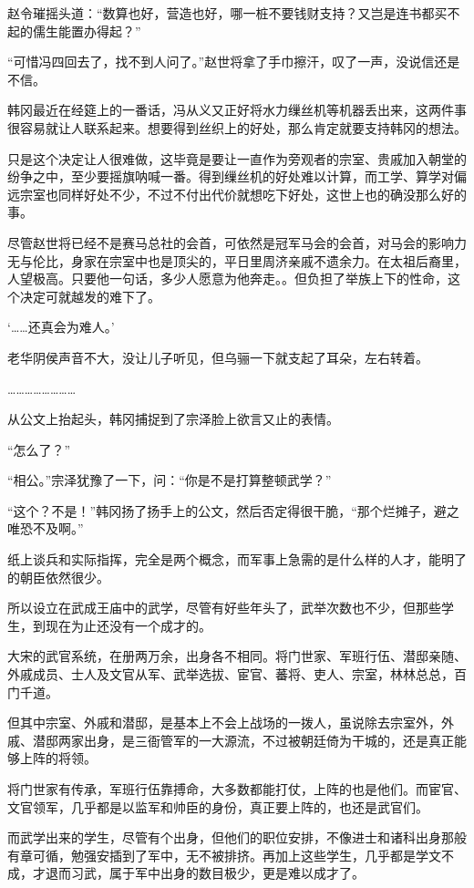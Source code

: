 赵令璀摇头道：“数算也好，营造也好，哪一桩不要钱财支持？又岂是连书都买不起的儒生能置办得起？”

“可惜冯四回去了，找不到人问了。”赵世将拿了手巾擦汗，叹了一声，没说信还是不信。

韩冈最近在经筵上的一番话，冯从义又正好将水力缫丝机等机器丢出来，这两件事很容易就让人联系起来。想要得到丝织上的好处，那么肯定就要支持韩冈的想法。

只是这个决定让人很难做，这毕竟是要让一直作为旁观者的宗室、贵戚加入朝堂的纷争之中，至少要摇旗呐喊一番。得到缫丝机的好处难以计算，而工学、算学对偏远宗室也同样好处不少，不过不付出代价就想吃下好处，这世上也的确没那么好的事。

尽管赵世将已经不是赛马总社的会首，可依然是冠军马会的会首，对马会的影响力无与伦比，身家在宗室中也是顶尖的，平日里周济亲戚不遗余力。在太祖后裔里，人望极高。只要他一句话，多少人愿意为他奔走。。但负担了举族上下的性命，这个决定可就越发的难下了。

‘……还真会为难人。’

老华阴侯声音不大，没让儿子听见，但乌骊一下就支起了耳朵，左右转着。

……………………

从公文上抬起头，韩冈捕捉到了宗泽脸上欲言又止的表情。

“怎么了？”

“相公。”宗泽犹豫了一下，问：“你是不是打算整顿武学？”

“这个？不是！”韩冈扬了扬手上的公文，然后否定得很干脆，“那个烂摊子，避之唯恐不及啊。”

纸上谈兵和实际指挥，完全是两个概念，而军事上急需的是什么样的人才，能明了的朝臣依然很少。

所以设立在武成王庙中的武学，尽管有好些年头了，武举次数也不少，但那些学生，到现在为止还没有一个成才的。

大宋的武官系统，在册两万余，出身各不相同。将门世家、军班行伍、潜邸亲随、外戚成员、士人及文官从军、武举选拔、宦官、蕃将、吏人、宗室，林林总总，百门千道。

但其中宗室、外戚和潜邸，是基本上不会上战场的一拨人，虽说除去宗室外，外戚、潜邸两家出身，是三衙管军的一大源流，不过被朝廷倚为干城的，还是真正能够上阵的将领。

将门世家有传承，军班行伍靠搏命，大多数都能打仗，上阵的也是他们。而宦官、文官领军，几乎都是以监军和帅臣的身份，真正要上阵的，也还是武官们。

而武学出来的学生，尽管有个出身，但他们的职位安排，不像进士和诸科出身那般有章可循，勉强安插到了军中，无不被排挤。再加上这些学生，几乎都是学文不成，才退而习武，属于军中出身的数目极少，更是难以成才了。

